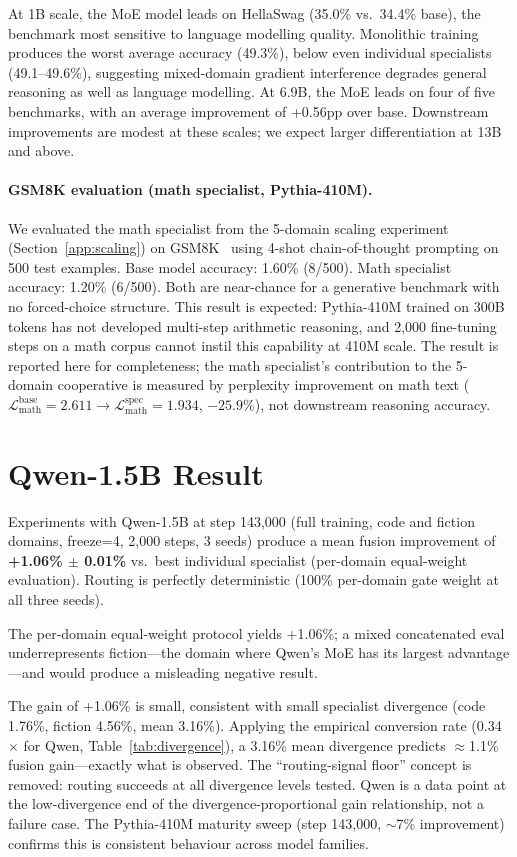 \documentclass{article}
\begin{document}
At 1B scale, the MoE model leads on HellaSwag (35.0\% vs.\ 34.4\% base), the benchmark most sensitive to language modelling quality. Monolithic training produces the worst average accuracy (49.3\%), below even individual specialists (49.1--49.6\%), suggesting mixed-domain gradient interference degrades general reasoning as well as language modelling. At 6.9B, the MoE leads on four of five benchmarks, with an average improvement of +0.56pp over base. Downstream improvements are modest at these scales; we expect larger differentiation at 13B and above.

\paragraph{GSM8K evaluation (math specialist, Pythia-410M).}
We evaluated the math specialist from the 5-domain scaling experiment (Section~\ref{app:scaling}) on GSM8K~\citep{cobbe2021training} using 4-shot chain-of-thought prompting on 500 test examples. Base model accuracy: 1.60\% (8/500). Math specialist accuracy: 1.20\% (6/500). Both are near-chance for a generative benchmark with no forced-choice structure. This result is expected: Pythia-410M trained on 300B tokens has not developed multi-step arithmetic reasoning, and 2,000 fine-tuning steps on a math corpus cannot instil this capability at 410M scale. The result is reported here for completeness; the math specialist's contribution to the 5-domain cooperative is measured by perplexity improvement on math text ($\mathcal{L}_\text{math}^\text{base} = 2.611 \to \mathcal{L}_\text{math}^\text{spec} = 1.934$, $-25.9\%$), not downstream reasoning accuracy.

\section{Qwen-1.5B Result}
\label{app:qwen}

Experiments with Qwen-1.5B at step 143,000 (full training, code and fiction domains, freeze=4, 2,000 steps, 3 seeds) produce a mean fusion improvement of \textbf{+1.06\% $\pm$ 0.01\%} vs.\ best individual specialist (per-domain equal-weight evaluation). Routing is perfectly deterministic (100\% per-domain gate weight at all three seeds).

The per-domain equal-weight protocol yields +1.06\%; a mixed concatenated eval underrepresents fiction---the domain where Qwen's MoE has its largest advantage---and would produce a misleading negative result.

The gain of +1.06\% is small, consistent with small specialist divergence (code 1.76\%, fiction 4.56\%, mean 3.16\%). Applying the empirical conversion rate (0.34$\times$ for Qwen, Table~\ref{tab:divergence}), a 3.16\% mean divergence predicts $\approx$1.1\% fusion gain---exactly what is observed. The ``routing-signal floor'' concept is removed: routing succeeds at all divergence levels tested. Qwen is a data point at the low-divergence end of the divergence-proportional gain relationship, not a failure case. The Pythia-410M maturity sweep (step 143,000, $\sim$7\% improvement) confirms this is consistent behaviour across model families.
\end{document}
